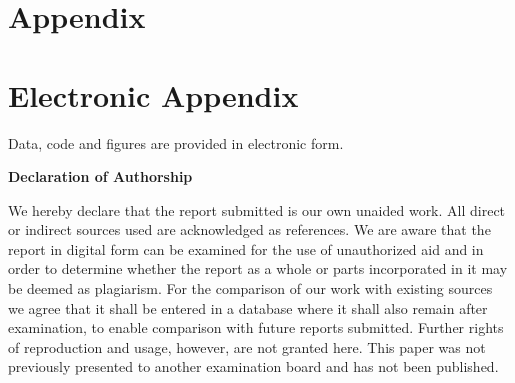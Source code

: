 \documentclass[12pt]{article}
\begin{document}
\newpage

    


\setcounter{page}{5}

\appendix

\section{Appendix}
\label{app}
% 
\newpage

\section{Electronic Appendix}
\label{el_app}

Data, code and figures are provided in electronic form.

\newpage
    

\RaggedRight


\newpage


\Large
\noindent
\textbf{Declaration of Authorship} 
\vspace{0.5cm}
\noindent
\normalsize

We hereby declare that the report submitted is our own unaided work. All direct 
or indirect sources used are acknowledged as references. We are aware that the 
report in digital form can be examined for the use of unauthorized aid and in 
order to determine whether the report as a whole or parts incorporated in it may 
be deemed as plagiarism. For the comparison of our work with existing sources we 
agree that it shall be entered in a database where it shall also remain after 
examination, to enable comparison with future reports submitted. Further rights 
of reproduction and usage, however, are not granted here. This paper was not 
previously presented to another examination board and has not been published. 

\end{document}
